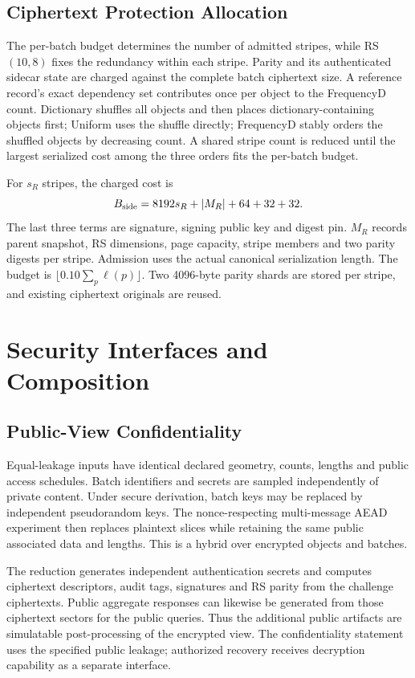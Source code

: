 \documentclass[10pt,journal,onecolumn]{IEEEtran}
\begin{document}
\subsection{Ciphertext Protection Allocation}
The per-batch budget determines the number of admitted stripes, while
RS$(10,8)$ fixes the redundancy within each stripe. Parity and its authenticated
sidecar state are charged against the complete batch ciphertext size.
A reference record's exact dependency set contributes once per object to the
FrequencyD count. Dictionary shuffles all objects and then places
 dictionary-containing objects first; Uniform uses the shuffle directly;
FrequencyD stably orders the shuffled objects by decreasing count. A shared
stripe count is reduced until the largest serialized cost among the three
orders fits the per-batch budget.

For $s_R$ stripes, the charged cost is
\[
B_{\rm side}=8192s_R+|M_R|+64+32+32.
\]
The last three terms are signature, signing public key and digest pin.
$M_R$ records parent snapshot, RS dimensions, page capacity, stripe members
and two parity digests per stripe. Admission uses the actual canonical
serialization length. The budget is
$\lfloor0.10\sum_p\ell(p)\rfloor$. Two 4096-byte parity shards are stored
per stripe, and existing ciphertext originals are reused.

\section{Security Interfaces and Composition}
\subsection{Public-View Confidentiality}
Equal-leakage inputs have identical declared geometry, counts, lengths and
public access schedules. Batch identifiers and secrets are sampled
independently of private content. Under secure derivation, batch keys may
be replaced by independent pseudorandom keys. The nonce-respecting
multi-message AEAD experiment then replaces plaintext slices while retaining
the same public associated data and lengths. This is a hybrid over encrypted
objects and batches.

The reduction generates independent authentication secrets and computes
ciphertext descriptors, audit tags, signatures and RS parity from the
challenge ciphertexts. Public aggregate responses can likewise be generated
from those ciphertext sectors for the public queries. Thus the additional
public artifacts are simulatable post-processing of the encrypted view.
The confidentiality statement uses the specified public leakage; authorized
recovery receives decryption capability as a separate interface.
\end{document}
